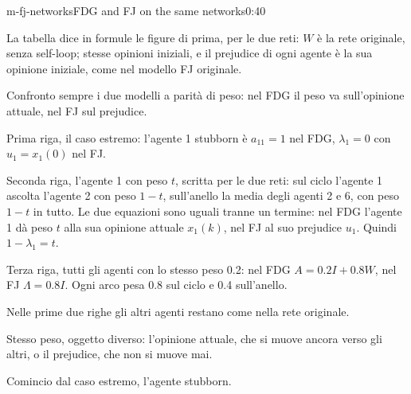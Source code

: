 \begin{slide}{m-fj-networks}{FDG and FJ on the same networks}{0:40}
  \begin{discorso}
    \item La tabella dice in formule le figure di prima, per le due reti: $W$ è la rete originale, senza self-loop; stesse opinioni iniziali, e il prejudice di ogni agente è la sua opinione iniziale, come nel modello FJ originale.
    \item Confronto sempre i due modelli a parità di peso: nel FDG il peso va sull'opinione attuale, nel FJ sul prejudice.
    \item Prima riga, il caso estremo: l'agente 1 stubborn è $a_{11}=1$ nel FDG, $\lambda_1=0$ con $u_1=x_1(0)$ nel FJ.
    \item Seconda riga, l'agente 1 con peso $t$, scritta per le due reti: sul ciclo l'agente 1 ascolta l'agente 2 con peso $1-t$, sull'anello la media degli agenti 2 e 6, con peso $1-t$ in tutto. Le due equazioni sono uguali tranne un termine: nel FDG l'agente 1 dà peso $t$ alla sua opinione attuale $x_1(k)$, nel FJ al suo prejudice $u_1$. Quindi $1-\lambda_1=t$.
    \item Terza riga, tutti gli agenti con lo stesso peso 0.2: nel FDG $A=0.2I+0.8W$, nel FJ $\Lambda=0.8I$. Ogni arco pesa 0.8 sul ciclo e 0.4 sull'anello.
    \item Nelle prime due righe gli altri agenti restano come nella rete originale.
    \item Stesso peso, oggetto diverso: l'opinione attuale, che si muove ancora verso gli altri, o il prejudice, che non si muove mai.
    \item Comincio dal caso estremo, l'agente stubborn.
  \end{discorso}
\end{slide}

